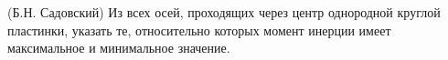 (Б.Н. Садовский)
Из всех осей, проходящих через центр однородной круглой пластинки,
указать те, относительно которых момент инерции имеет максимальное и
минимальное значение.
